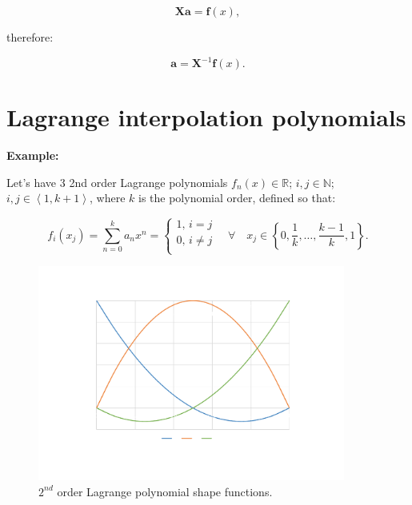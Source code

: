 \documentclass[10pt,b5paper,titlepage]{book}
\begin{document}
\begin{equation}
    \mathbf{X}\mathbf{a} = \mathbf{f}(x)
,\end{equation}

therefore:

\begin{equation}
    \mathbf{a} = \mathbf{X}^{-1} \mathbf{f}(x)
.\end{equation}

\section{Lagrange interpolation polynomials}

\textbf{Example:}

Let's have 3 2nd order Lagrange polynomials
$f_{n}(x) \in \mathbb{R}$; $i, j \in \mathbb{N}$; $i, j \in \left< 1, k + 1 \right>$,
where $k$ is the polynomial order, defined so that:

\begin{equation}
    f_{i}(x_{j}) = \sum_{n=0}^{k} a_{n}x^{n}
          = \left\{
              \begin{array}{l}
                  1 \text{, } i = j \\
                  0 \text{, } i \neq j \\
              \end{array}
          \right. \quad \forall \quad x_{j} \in \left\{
                0, \frac{1}{k}, \ldots, \frac{k - 1}{k}, 1
          \right\}
.\end{equation}

\begin{figure}[h]
    \centering
    \includegraphics[width=0.90\textwidth]{img/matrix_poly.pdf}
    \caption{$2^{nd}$ order Lagrange polynomial shape functions.}
    \label{fig:matrix-poly-pdf}
\end{figure}
\end{document}
